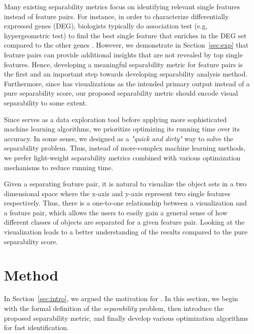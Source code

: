  Many existing separability metrics focus on identifying relevant single features instead of feature pairs. For instance, in order to characterize differentially expressed genes (DEG), biologists typically do association test (e.g, hypergeometric test) to find the best single feature that enriches in the DEG set compared to the other genes . However, we demonstrate in Section~\ref{sec:exp} that feature pairs can provide additional insights that are not revealed by top single features. Hence, developing a meaningful separability metric for feature pairs is the first and an important step towards developing separability analysis method. Furthermore, since \genviz has visualizations as the intended primary output instead of a pure separability score, our proposed separability metric should encode visual separability to some extent. 

 Since \genviz serves as a data exploration tool before applying more sophisticated machine learning algorithms, we prioritize optimizing its running time over its accuracy. In some sense, we designed \genviz as a  {\em "quick and dirty"} way to solve the separability problem. Thus, instead of more-complex machine learning methods, we prefer light-weight separability metrics combined with various optimization mechanisms to reduce running time. 

 Given a separating feature pair, it is natural to visualize the object sets in a two dimensional space where the x-axis and y-axis represent two single features respectively. Thus, there is a one-to-one relationship between a visualization and a feature pair, which allows the users to  easily gain  a general sense of how different classes of objects are separated for a given feature pair. Looking at the visualization leads to a better understanding of the results compared to the pure separability score.




\section{Method}
\label{sec:method}
In Section~\ref{sec:intro}, we argued the motivation for \genviz. In this section, we begin with the formal definition of the {\em separability} problem, then introduce the proposed separability metric, and finally develop various optimization algorithms for fast identification.
